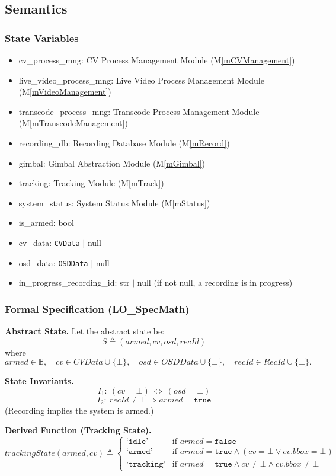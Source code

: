 \documentclass[12pt, titlepage]{article}
\newcommand{\mref}[1]{M\ref{#1}}
\begin{document}
\subsection{Semantics}

\subsubsection{State Variables}

\begin{itemize}
  \item cv\_process\_mng: CV Process Management Module (\mref{mCVManagement})
  \item live\_video\_process\_mng: Live Video Process Management Module
        (\mref{mVideoManagement})
  \item transcode\_process\_mng: Transcode Process Management Module
        (\mref{mTranscodeManagement})
  \item recording\_db: Recording Database Module (\mref{mRecord})
  \item gimbal: Gimbal Abstraction Module (\mref{mGimbal})
  \item tracking: Tracking Module (\mref{mTrack})
  \item system\_status: System Status Module (\mref{mStatus})
  \item is\_armed: bool
  \item cv\_data: \texttt{CVData} $|$ null
  \item osd\_data: \texttt{OSDData} $|$ null
  \item in\_progress\_recording\_id: str $|$ null (if not null, a recording is in
        progress)
\end{itemize}

\subsubsection{Formal Specification (LO\_SpecMath)}

\noindent\textbf{Abstract State.}
Let the abstract state be:
\[
  S \triangleq (armed, cv, osd, recId)
\]
where
\[
  armed \in \mathbb{B},\quad
  cv \in CVData \cup \{\bot\},\quad
  osd \in OSDData \cup \{\bot\},\quad
  recId \in \textit{RecId} \cup \{\bot\}.
\]

\noindent\textbf{State Invariants.}
\[
  I_1:\ (cv=\bot)\ \Leftrightarrow\ (osd=\bot)
\]
\[
  I_2:\ recId \neq \bot \Rightarrow armed=\texttt{true}
\]
(Recording implies the system is armed.)

\noindent\textbf{Derived Function (Tracking State).}
\[
  trackingState(armed, cv) \triangleq
  \begin{cases}
    \texttt{`idle'}     & \text{if } armed = \texttt{false}                                       \\
    \texttt{`armed'}    & \text{if } armed = \texttt{true} \land (cv=\bot \lor cv.bbox=\bot)      \\
    \texttt{`tracking'} & \text{if } armed = \texttt{true} \land cv\neq\bot \land cv.bbox\neq\bot
  \end{cases}
\]
\end{document}
